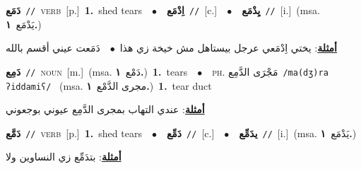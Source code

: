 \documentclass[10pt,a4paper,twoside]{article} %
\begin{document}
\begin{multicols}{2}
{\setlength\topsep{0pt}\textbf{\foreignlanguage{arabic}{دَمَع}}\ {\color{gray}\texttt{//}\color{black}}\ \textsc{verb}\ [p.]\ \textbf{1.}~shed tears\ \ $\bullet$\ \ \setlength\topsep{0pt}\textbf{\foreignlanguage{arabic}{اِدْمَع}}\ {\color{gray}\texttt{//}\color{black}}\ [c.]\ \ $\bullet$\ \ \setlength\topsep{0pt}\textbf{\foreignlanguage{arabic}{يِدْمَع}}\ {\color{gray}\texttt{//}\color{black}}\ [i.]\ \color{gray}(msa. \foreignlanguage{arabic}{يَدْمَع}~\foreignlanguage{arabic}{\textbf{١.}})\color{black}\  \begin{flushright}\color{gray}\foreignlanguage{arabic}{\textbf{\underline{\foreignlanguage{arabic}{أمثلة}}}: يختي اِدْمَعي عرجل بيستاهل مش خيخة زي هذا\ $\bullet$\ \  دَمَعت عيني أقسم بالله}\end{flushright}\color{black}} \vspace{2mm}

{\setlength\topsep{0pt}\textbf{\foreignlanguage{arabic}{دَمِع}}\ {\color{gray}\texttt{//}\color{black}}\ \textsc{noun}\ [m.]\ \color{gray}(msa. \foreignlanguage{arabic}{دَمْع}~\foreignlanguage{arabic}{\textbf{١.}})\color{black}\ \textbf{1.}~tears\ \ $\bullet$\ \ \textsc{ph.} \color{gray} \foreignlanguage{arabic}{مَجْرَى الدَّمِع}\color{black}\ {\color{gray}\texttt{/{\sffamily ma(dʒ)ra ʔiddamiʕ}/}\color{black}}\ \color{gray} (msa. \foreignlanguage{arabic}{مجرى الدَّمْع}~\foreignlanguage{arabic}{\textbf{١.}})\color{black}\ \textbf{1.}~tear duct\  \begin{flushright}\color{gray}\foreignlanguage{arabic}{\textbf{\underline{\foreignlanguage{arabic}{أمثلة}}}: عندي التهاب بمجرى الدَّمِع عيوني بوجعوني}\end{flushright}\color{black}} \vspace{2mm}

{\setlength\topsep{0pt}\textbf{\foreignlanguage{arabic}{دَمَّع}}\ {\color{gray}\texttt{//}\color{black}}\ \textsc{verb}\ [p.]\ \textbf{1.}~shed tears\ \ $\bullet$\ \ \setlength\topsep{0pt}\textbf{\foreignlanguage{arabic}{دَمِّع}}\ {\color{gray}\texttt{//}\color{black}}\ [c.]\ \ $\bullet$\ \ \setlength\topsep{0pt}\textbf{\foreignlanguage{arabic}{يدَمِّع}}\ {\color{gray}\texttt{//}\color{black}}\ [i.]\ \color{gray}(msa. \foreignlanguage{arabic}{يَدْمَع}~\foreignlanguage{arabic}{\textbf{١.}})\color{black}\  \begin{flushright}\color{gray}\foreignlanguage{arabic}{\textbf{\underline{\foreignlanguage{arabic}{أمثلة}}}: بتدَمِّع زي النساوين ولا}\end{flushright}\color{black}} \vspace{2mm}


\end{multicols}
\end{document}
